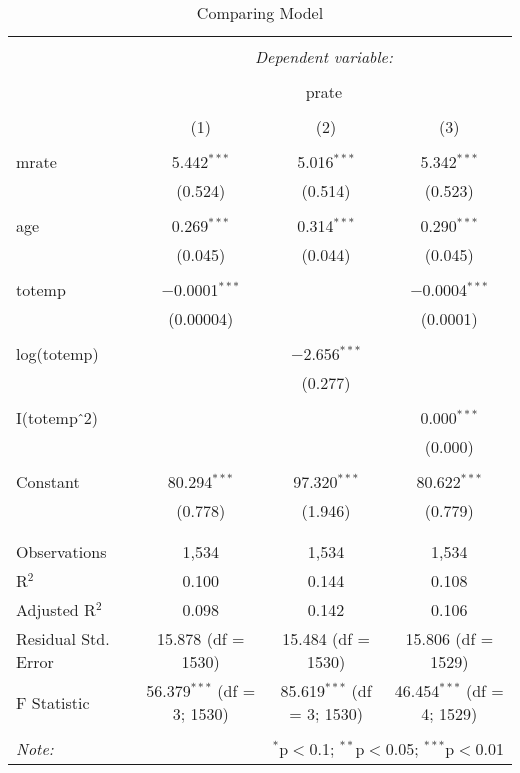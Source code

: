 \documentclass[12pt,a4paper]{article}
\author{Neeraj Jain}
\begin{document}
	\begin{table}[!htbp] \centering 
		\caption{Comparing Model} 
		\label{} 
		\begin{tabular}{@{\extracolsep{5pt}}lccc} 
			\\[-1.8ex]\hline 
			\hline \\[-1.8ex] 
			& \multicolumn{3}{c}{\textit{Dependent variable:}} \\ 
			\cline{2-4} 
			\\[-1.8ex] & \multicolumn{3}{c}{prate} \\ 
			\\[-1.8ex] & (1) & (2) & (3)\\ 
			\hline \\[-1.8ex] 
			mrate & 5.442$^{***}$ & 5.016$^{***}$ & 5.342$^{***}$ \\ 
			& (0.524) & (0.514) & (0.523) \\ 
			& & & \\ 
			age & 0.269$^{***}$ & 0.314$^{***}$ & 0.290$^{***}$ \\ 
			& (0.045) & (0.044) & (0.045) \\ 
			& & & \\ 
			totemp & $-$0.0001$^{***}$ &  & $-$0.0004$^{***}$ \\ 
			& (0.00004) &  & (0.0001) \\ 
			& & & \\ 
			log(totemp) &  & $-$2.656$^{***}$ &  \\ 
			&  & (0.277) &  \\ 
			& & & \\ 
			I(totemp$\hat{\mkern6mu}$2) &  &  & 0.000$^{***}$ \\ 
			&  &  & (0.000) \\ 
			& & & \\ 
			Constant & 80.294$^{***}$ & 97.320$^{***}$ & 80.622$^{***}$ \\ 
			& (0.778) & (1.946) & (0.779) \\ 
			& & & \\ 
			\hline \\[-1.8ex] 
			Observations & 1,534 & 1,534 & 1,534 \\ 
			R$^{2}$ & 0.100 & 0.144 & 0.108 \\ 
			Adjusted R$^{2}$ & 0.098 & 0.142 & 0.106 \\ 
			Residual Std. Error & 15.878 (df = 1530) & 15.484 (df = 1530) & 15.806 (df = 1529) \\ 
			F Statistic & 56.379$^{***}$ (df = 3; 1530) & 85.619$^{***}$ (df = 3; 1530) & 46.454$^{***}$ (df = 4; 1529) \\ 
			\hline 
			\hline \\[-1.8ex] 
			\textit{Note:}  & \multicolumn{3}{r}{$^{*}$p$<$0.1; $^{**}$p$<$0.05; $^{***}$p$<$0.01} \\ 
		\end{tabular} 
	\end{table} 
	
\end{document}
